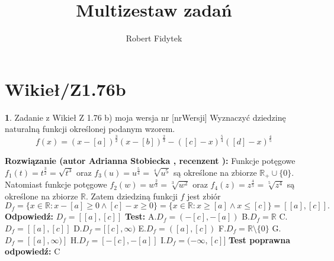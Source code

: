 \documentclass[12pt, a4paper]{article}
\title{Multizestaw zadań}
\author{Robert Fidytek}
\date{}
\theoremstyle{definition} %
\newtheorem{zad}{}
\newcommand{\kategoria}[1]{\section{#1}} %
\newcommand{\zadStart}[1]{\begin{zad}#1\newline} %
\newcommand{\zadStop}{\end{zad}}   %
\newcommand{\rozwStart}[2]{\noindent \textbf{Rozwiązanie (autor #1 , recenzent #2): }\newline} %
\newcommand{\rozwStop}{\newline}                                            %
\newcommand{\odpStart}{\noindent \textbf{Odpowiedź:}\newline}    %
\newcommand{\odpStop}{\newline}                                             %
\newcommand{\testStart}{\noindent \textbf{Test:}\newline} %
\newcommand{\testStop}{\newline} %
\newcommand{\kluczStart}{\noindent \textbf{Test poprawna odpowiedź:}\newline} %
\newcommand{\kluczStop}{\newline} %
\begin{document}
\maketitle


\kategoria{Wikieł/Z1.76b}
\zadStart{Zadanie z Wikieł Z 1.76 b) moja wersja nr [nrWersji]}
Wyznaczyć dziedzinę naturalną funkcji określonej podanym wzorem.
$$f(x)=(x-[a])^{\frac{3}{2}}(x-[b])^{\frac{2}{3}}-([c]-x)^{\frac{5}{4}}([d]-x)^{\frac{4}{5}}$$
\zadStop
\rozwStart{Adrianna Stobiecka}{}
Funkcje potęgowe $f_1(t)=t^{\frac{3}{2}}=\sqrt{t^3}$ oraz $f_3(u)=u^{\frac{5}{4}}=\sqrt[4]{u^5}$ są określone na zbiorze $\mathbb{R}_+\cup\{0\}$. Natomiast funkcje potęgowe $f_2(w)=w^{\frac{2}{3}}=\sqrt[3]{w^2}$ oraz $f_4(z)=z^{\frac{4}{5}}=\sqrt[5]{z^4}$ są określone na zbiorze $\mathbb{R}$. Zatem dziedziną funkcji $f$ jest zbiór
$$D_{f}=\{x\in\mathbb{R}:x-[a]\geq0 \land [c]-x\geq0\}=\{x\in\mathbb{R}:x\geq[a] \land x\leq[c]\}=[[a],[c]].$$
\rozwStop
\odpStart
$D_f=[[a],[c]]$
\odpStop
\testStart
A.$D_f=(-[c],-[a])$
B.$D_f=\mathbb{R}$
C.$D_f=[[a],[c]]$
D.$D_f=[[c],\infty)$
E.$D_f=([a],[c])$
F.$D_f=\mathbb{R}\setminus\{0\}$
G.$D_f=[[a],\infty)]$
H.$D_f=[-[c],-[a]]$
I.$D_f=(-\infty,[c]]$
\testStop
\kluczStart
C
\kluczStop
\end{document}
